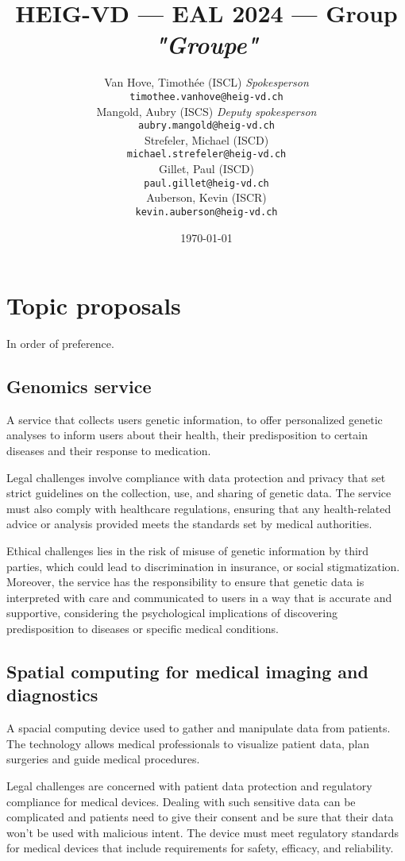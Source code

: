 \documentclass[a4paper]{article}
\title{HEIG-VD --- EAL 2024 --- Group \textit{"Groupe"}}
\author{
    Van Hove, Timothée (ISCL) \textit{Spokesperson}\\\texttt{timothee.vanhove@heig-vd.ch}\\
    Mangold, Aubry (ISCS) \textit{Deputy spokesperson}\\\texttt{aubry.mangold@heig-vd.ch}\\
    Strefeler, Michael (ISCD)\\\texttt{michael.strefeler@heig-vd.ch}\\
    Gillet, Paul (ISCD)\\\texttt{paul.gillet@heig-vd.ch}\\
    Auberson, Kevin (ISCR)\\\texttt{kevin.auberson@heig-vd.ch}\\
}
\date{\today}
\begin{document}
\maketitle

\section{Topic proposals}

In order of preference.

\subsection{Genomics service}

A service that collects users genetic information, to offer personalized genetic analyses to inform users about their health, their predisposition to certain diseases and their response to medication.

Legal challenges involve compliance with data protection and privacy that set strict guidelines on the collection, use, and sharing of genetic data. The service must also comply with healthcare regulations, ensuring that any health-related advice or analysis provided meets the standards set by medical authorities.

Ethical challenges lies in the risk of misuse of genetic information by third parties, which could lead to discrimination in insurance, or social stigmatization. Moreover, the service has the responsibility to ensure that genetic data is interpreted with care and communicated to users in a way that is accurate and supportive, considering the psychological implications of discovering predisposition to diseases or specific medical conditions.

\subsection{Spatial computing for medical imaging and diagnostics}

A spacial computing device used to gather and manipulate data from patients. The technology allows medical professionals to visualize patient data, plan surgeries and guide medical procedures.

Legal challenges are concerned with patient data protection and regulatory compliance for medical devices. Dealing with such sensitive data can be complicated and patients need to give their consent and be sure that their data won't be used with malicious intent. The device must meet regulatory standards for medical devices that include requirements for safety, efficacy, and reliability.
\end{document}
